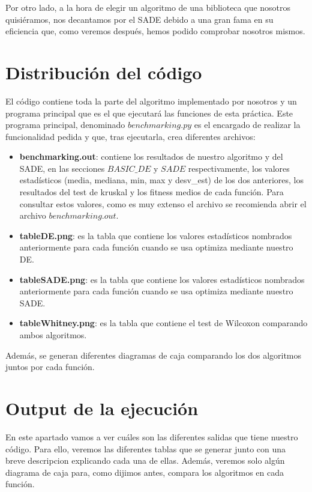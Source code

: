 \documentclass[11pt, a4paper, titlepage]{article}
\begin{document}
\vspace{5mm}

Por otro lado, a la hora de elegir un algoritmo de una biblioteca que nosotros quisiéramos, nos decantamos por el SADE debido a una gran fama en su eficiencia que, como veremos después, hemos podido comprobar nosotros mismos.

\newpage

\section{Distribución del código}
El código contiene toda la parte del algoritmo implementado por nosotros y un programa principal que es el que ejecutará las funciones de esta práctica. Este programa principal, denominado $benchmarking.py$ es el encargado de realizar la funcionalidad pedida y que, tras ejecutarla, crea diferentes archivos:

\begin{itemize}
\item \textbf{benchmarking.out}: contiene los resultados de nuestro algoritmo y del SADE, en las secciones $BASIC\_DE$ y $SADE$ respectivamente, los valores estadísticos (media, mediana, min, max y desv\_est) de los dos anteriores, los resultados del test de kruskal y los fitness medios de cada función. Para consultar estos valores, como es muy extenso el archivo se recomienda abrir el archivo $benchmarking.out$.
\item \textbf{tableDE.png}: es la tabla que contiene los valores estadísticos nombrados anteriormente para cada función cuando se usa optimiza mediante nuestro DE.
\item \textbf{tableSADE.png}: es la tabla que contiene los valores estadísticos nombrados anteriormente para cada función cuando se usa optimiza mediante nuestro SADE.
\item \textbf{tableWhitney.png}: es la tabla que contiene el test de Wilcoxon comparando ambos algoritmos.
\end{itemize}
Además, se generan diferentes diagramas de caja comparando los dos algoritmos juntos por cada función.

\newpage

\section{Output de la ejecución}
En este apartado vamos a ver cuáles son las diferentes salidas que tiene nuestro código. Para ello, veremos las diferentes tablas que se generar junto con una breve descripcion explicando cada una de ellas. Además, veremos solo algún diagrama de caja para, como dijimos antes, compara los algoritmos en cada función.
\end{document}
